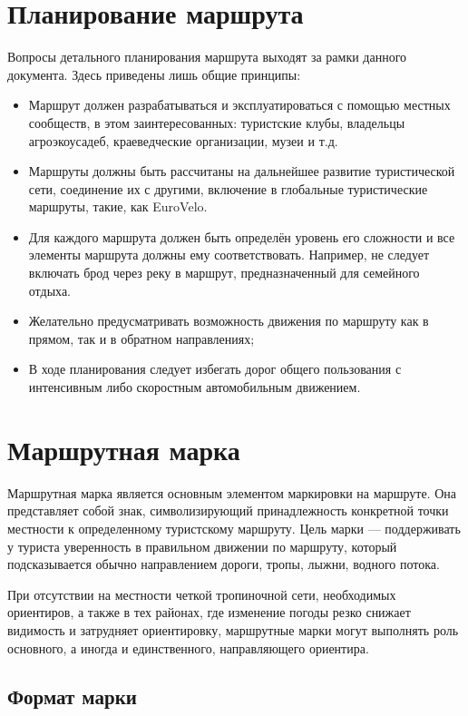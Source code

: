 \documentclass[a5paper,10pt,titlepage]{extarticle}
\begin{document}
\section{Планирование маршрута}

Вопросы детального планирования маршрута выходят за рамки данного документа. Здесь приведены лишь общие принципы:
\begin{itemize}
	\item Маршрут должен разрабатываться и эксплуатироваться с помощью местных сообществ, в этом заинтересованных:
		туристские клубы, владельцы агроэкоусадеб, краеведческие организации, музеи и т.д.
	\item Маршруты должны быть рассчитаны на дальнейшее развитие туристической сети, соединение их с другими,
		включение в глобальные туристические маршруты, такие, как EuroVelo.
	\item Для каждого маршрута должен быть определён уровень его сложности и все элементы маршрута должны ему
		соответствовать. Например, не следует включать брод через реку в маршрут, предназначенный для семейного
		отдыха.
	\item Желательно предусматривать возможность движения по маршруту как в прямом, так и в обратном направлениях;
	\item В ходе планирования следует избегать дорог общего пользования с интенсивным либо скоростным автомобильным
		движением.
\end{itemize}


\section{Маршрутная марка}

Маршрутная марка является основным элементом маркировки на маршруте. Она представляет собой знак, символизирующий
принадлежность конкретной точки местности к определенному туристскому маршруту. Цель марки --- поддерживать у туриста
уверенность в правильном движении по маршруту, который подсказывается обычно направлением дороги, тропы, лыжни, водного
потока.

При отсутствии на местности четкой тропиночной сети, необходимых ориентиров, а также в тех районах, где изменение погоды
резко снижает видимость и затрудняет ориентировку, маршрутные марки могут выполнять роль основного, а иногда и
единственного, направляющего ориентира.

\subsection{Формат марки}
\end{document}
